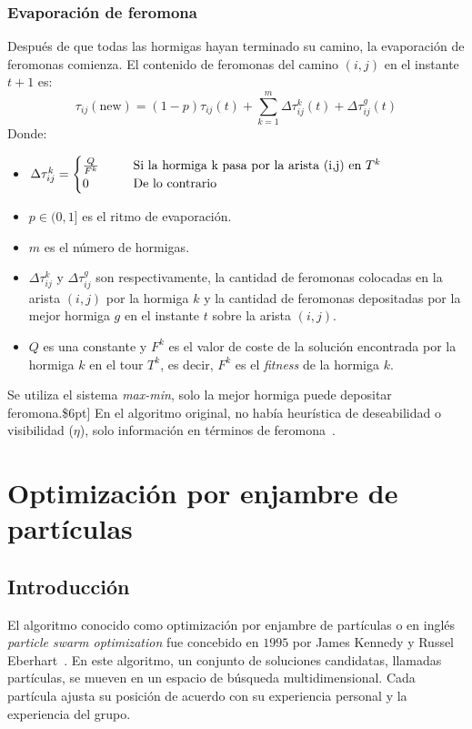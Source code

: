 \subsubsection{Evaporación de feromona}
Después de que todas las hormigas hayan terminado su camino, la evaporación de feromonas comienza. El contenido de feromonas del camino $(i,j)$ en el instante $t+1$ es:
\begin{equation}
    \tau_{ij}(\text{new})=(1-p)\tau_{ij}(t)+\sum_{k=1}^m\Delta\tau_{ij}^k(t)+\Delta\tau_{ij}^g(t)
\end{equation}
Donde:
\begin{itemize}
    \item $\Delta\tau_{ij}^k=\begin{cases}\frac{Q}{F^k}&\hspace{6mm}\text{Si la hormiga k pasa por la arista (i,j) en }T^k\\0 &\hspace{6mm}\text{De lo contrario}\end{cases}$
    \item $p\in (0,1]$ es el ritmo de evaporación.
    \item $m$ es el número de hormigas.
    \item $\Delta\tau_{ij}^k$ y $\Delta\tau_{ij}^g$ son respectivamente, la cantidad de feromonas colocadas en la arista $(i,j)$ por la hormiga $k$ y la cantidad de feromonas depositadas por la mejor hormiga $g$ en el instante $t$ sobre la arista $(i,j)$.
    \item $Q$ es una constante y $F^k$ es el valor de coste de la solución encontrada por la hormiga $k$ en el tour $T^k$, es decir, $F^k$ es el \textit{fitness} de la hormiga $k$.
\end{itemize}
Se utiliza el sistema \textit{max-min}, solo la mejor hormiga puede depositar feromona.\$6pt]
En el algoritmo original, no había heurística de deseabilidad o visibilidad ($\eta$), solo información en términos de feromona~\cite{dorigo_ant_1999}.

\section{Optimización por enjambre de partículas}
\subsection{Introducción}
El algoritmo conocido como optimización por enjambre de partículas o en inglés \textit{particle swarm optimization} fue concebido en $1995$ por James Kennedy y Russel Eberhart~\cite{kennedy_particle_1995}. En este algoritmo, un conjunto de soluciones candidatas, llamadas partículas, se mueven en un espacio de búsqueda multidimensional. Cada partícula ajusta su posición de acuerdo con su experiencia personal y la experiencia del grupo.

